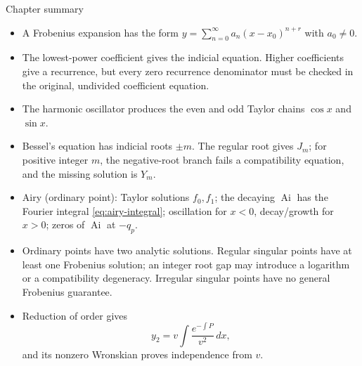 \documentclass[11pt]{beamer}
\providecommand{\Ai}{\operatorname{Ai}}
\begin{document}
\begin{frame}{Chapter summary}
\scriptsize
\begin{itemize}
  \item A Frobenius expansion has the form
        $y=\sum_{n=0}^{\infty}a_n(x-x_0)^{n+r}$ with $a_0\ne0$.
  \item The lowest-power coefficient gives the indicial equation.  Higher coefficients
        give a recurrence, but every zero recurrence denominator must be checked in the
        original, undivided coefficient equation.
  \item The harmonic oscillator produces the even and odd Taylor chains $\cos x$ and
        $\sin x$.
  \item Bessel's equation has indicial roots $\pm m$.  The regular root gives $J_m$; for
        positive integer $m$, the negative-root branch fails a compatibility equation,
        and the missing solution is $Y_m$.
  \item Airy (ordinary point): Taylor solutions $f_0,f_1$; the decaying $\Ai$ has the Fourier
        integral \eqref{eq:airy-integral}; oscillation for $x<0$,
        decay/growth for $x>0$; zeros of $\Ai$ at $-q_p$.
  \item Ordinary points have two analytic solutions.  Regular singular points have at
        least one Frobenius solution; an integer root gap may introduce a logarithm or a
        compatibility degeneracy.  Irregular singular points have no general Frobenius
        guarantee.
  \item Reduction of order gives
        \[
          y_2=v\int\frac{e^{-\int P}}{v^2}\,dx,
        \]
        and its nonzero Wronskian proves independence
        from $v$.
\end{itemize}
\end{frame}
\end{document}
